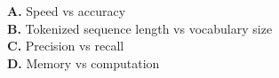 \documentclass[11pt]{article}
\begin{document}
\begin{enumerate}[label=Q\arabic*., leftmargin=*]
\textbf{A.} Speed vs accuracy\\
\textbf{B.} Tokenized sequence length vs vocabulary size\\
\textbf{C.} Precision vs recall\\
\textbf{D.} Memory vs computation

\end{enumerate}
\end{document}
